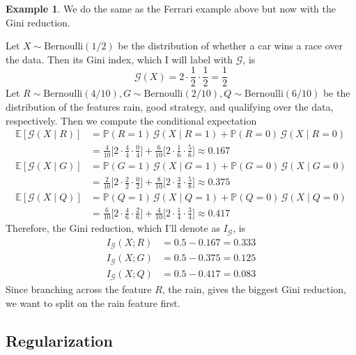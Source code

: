 \documentclass{article}
\theoremstyle{definition}
\newtheorem{example}{Example}[section]
\theoremstyle{remark}
\theoremstyle{definition}
\begin{document}
\begin{example}
We do the same as the Ferrari example above but now with the Gini reduction. 

Let $X \sim \mathrm{Bernoulli}(1/2)$ be the distribution of whether a car wins a race over the data. Then its Gini index, which I will label with $\mathcal{G}$, is \[\mathcal{G} (X) = 2 \cdot \frac{1}{2} \cdot \frac{1}{2} = \frac{1}{2}\]
Let $R \sim \mathrm{Bernoulli}(4/10), G \sim \mathrm{Bernoulli}(2/10), Q \sim \mathrm{Bernoulli}(6/10)$ be the distribution of the features rain, good strategy, and qualifying over the data, respectively. Then we compute the conditional expectation 
\begin{align*}
    \mathbb{E}[\mathcal{G}(X \mid R)] & = \mathbb{P}(R = 1)\, \mathcal{G}(X \mid R = 1) + \mathbb{P}(R = 0) \, \mathcal{G}(X \mid R = 0) \\ 
    & = \frac{4}{10} \bigg[ 2 \cdot \frac{4}{4} \cdot \frac{0}{4} \bigg] + \frac{6}{10} \bigg[ 2 \cdot \frac{1}{6} \cdot \frac{5}{6} \bigg] \approx 0.167 \\
    \mathbb{E}[\mathcal{G}(X \mid G)] & = \mathbb{P}(G = 1)\, \mathcal{G}(X \mid G = 1) + \mathbb{P}(G = 0) \, \mathcal{G}(X \mid G = 0) \\ 
    & = \frac{2}{10} \bigg[ 2 \cdot \frac{2}{2} \cdot \frac{0}{2} \bigg] + \frac{8}{10} \bigg[ 2 \cdot \frac{3}{8} \cdot \frac{5}{8} \bigg] \approx 0.375 \\
    \mathbb{E}[\mathcal{G}(X \mid Q)] & = \mathbb{P}(Q = 1)\, \mathcal{G}(X \mid Q = 1) + \mathbb{P}(Q = 0) \, \mathcal{G}(X \mid Q = 0) \\ 
    & = \frac{6}{10} \bigg[ 2 \cdot \frac{4}{6} \cdot \frac{2}{6} \bigg] + \frac{4}{10} \bigg[ 2 \cdot \frac{1}{4} \cdot \frac{3}{4} \bigg] \approx 0.417
\end{align*}
Therefore, the Gini reduction, which I'll denote as $I_{\mathcal{G}}$, is 
\begin{align*}
    I_{\mathcal{G}} (X ; R) & = 0.5 - 0.167 = 0.333 \\
    I_{\mathcal{G}} (X ; G) & = 0.5 - 0.375 = 0.125 \\
    I_{\mathcal{G}} (X ; Q) & = 0.5 - 0.417 = 0.083
\end{align*}
Since branching across the feature $R$, the rain, gives the biggest Gini reduction, we want to split on the rain feature first. 
\end{example}


\subsection{Regularization}
\end{document}
